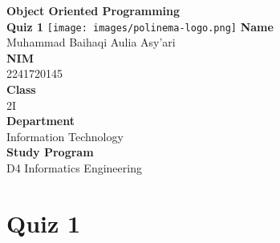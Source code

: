 \documentclass[12pt,titlepage]{article}
\newcommand{\vSubject}{Object Oriented Programming}
\newcommand{\vSubtitle}{Quiz 1}
\newcommand{\vName}{Muhammad Baihaqi Aulia Asy'ari}
\newcommand{\vNIM}{2241720145}
\newcommand{\vClass}{2I}
\newcommand{\vDepartment}{Information Technology}
\newcommand{\vStudyProgram}{D4 Informatics Engineering}
\begin{document}
\begin{titlepage}
    \centering
    \vfill
    {\bfseries\LARGE
        \vSubject\\
        \vskip0.25cm
        \vSubtitle
    }
    \vfill
    \texttt{[image: images/polinema-logo.png]}
    \vfill
    {
        \textbf{Name}\\
        \vName\\
        \vskip0.5cm
        \textbf{NIM}\\
        \vNIM\\
        \vskip0.5cm
        \textbf{Class}\\
        \vClass\\
        \vskip0.5cm
        \textbf{Department}\\
        \vDepartment\\
        \vskip0.5cm
        \textbf{Study Program}\\
        \vStudyProgram
    }
\end{titlepage}

\newpage
\section{Quiz 1}
\end{document}
